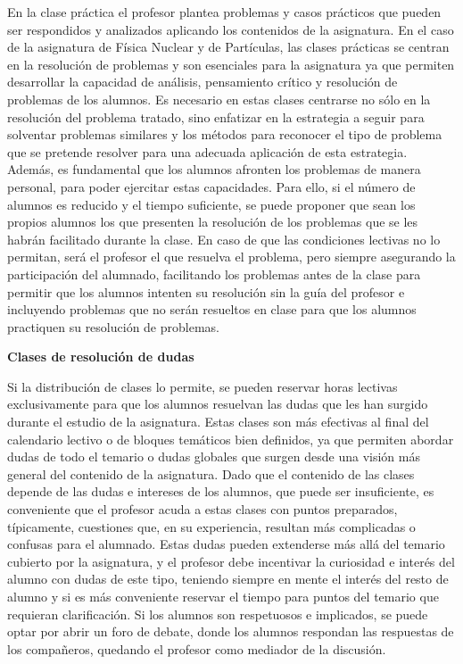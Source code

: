 \documentclass[a4paper,12pt,twoside]{article}
\begin{document}
En la clase práctica el profesor plantea problemas y casos prácticos que pueden ser respondidos y analizados aplicando los contenidos de la asignatura. En el caso de la asignatura de Física Nuclear y de Partículas, las clases prácticas se centran en la resolución de problemas y son esenciales para la asignatura ya que permiten desarrollar la capacidad de análisis, pensamiento crítico y resolución de problemas de los alumnos. Es necesario en estas clases centrarse no sólo en la resolución del problema tratado, sino enfatizar en la estrategia a seguir para solventar problemas similares y los métodos para reconocer el tipo de problema que se pretende resolver para una adecuada aplicación de esta estrategia. Además, es fundamental que los alumnos afronten los problemas de manera personal, para poder ejercitar estas capacidades. Para ello, si el número de alumnos es reducido y el tiempo suficiente, se puede proponer que sean los propios alumnos los que presenten la resolución de los problemas que se les habrán facilitado durante la clase. En caso de que las condiciones lectivas no lo permitan, será el profesor el que resuelva el problema, pero siempre asegurando la participación del alumnado, facilitando los problemas antes de la clase para permitir que los alumnos intenten su resolución sin la guía del profesor e incluyendo problemas que no serán resueltos en clase para que los alumnos practiquen su resolución de problemas. 

\textbf{Clases de resolución de dudas} 

Si la distribución de clases lo permite, se pueden reservar horas lectivas exclusivamente para que los alumnos resuelvan las dudas que les han surgido durante el estudio de la asignatura. Estas clases son más efectivas al final del calendario lectivo o de bloques temáticos bien definidos, ya que permiten abordar dudas de todo el temario o dudas globales que surgen desde una visión más general del contenido de la asignatura. Dado que el contenido de las clases depende de las dudas e intereses de los alumnos, que puede ser insuficiente, es conveniente que el profesor acuda a estas clases con puntos preparados, típicamente, cuestiones que, en su experiencia, resultan más complicadas o confusas para el alumnado. Estas dudas pueden extenderse más allá del temario cubierto por la asignatura, y el profesor debe incentivar la curiosidad e interés del alumno con dudas de este tipo, teniendo siempre en mente el interés del resto de alumno y si es más conveniente reservar el tiempo para puntos del temario que requieran clarificación. Si los alumnos son respetuosos e implicados, se puede optar por abrir un foro de debate, donde los alumnos respondan las respuestas de los compañeros, quedando el profesor como mediador de la discusión.
\end{document}
